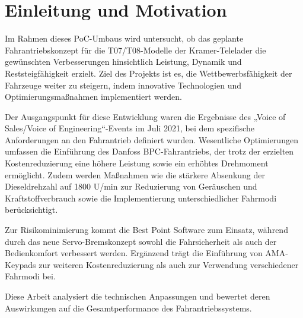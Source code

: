 \documentclass[a4paper, 12pt]{article} %
\begin{document}
\section{Einleitung und Motivation}
\begin{spacing}{1.5}  %
\fontsize{14pt}{14pt}\selectfont  %
Im Rahmen dieses \acf{PoC}-Umbaus wird untersucht, ob das 
geplante Fahrantriebskonzept für die T07/T08-Modelle der Kramer-Telelader 
die gewünschten Verbesserungen hinsichtlich Leistung, Dynamik und 
Reststeigfähigkeit erzielt. Ziel des Projekts ist es, die Wettbewerbsfähigkeit
der Fahrzeuge weiter zu steigern, indem innovative Technologien und 
Optimierungsmaßnahmen implementiert werden.

Der Ausgangspunkt für diese Entwicklung waren die Ergebnisse des
„Voice of Sales/Voice of Engineering“-Events im Juli 2021, bei dem 
spezifische Anforderungen an den Fahrantrieb definiert wurden. 
Wesentliche Optimierungen umfassen die Einführung des Danfoss 
\acf{BPC}-Fahrantriebs, der trotz der erzielten Kostenreduzierung eine höhere 
Leistung sowie ein erhöhtes Drehmoment ermöglicht. Zudem werden Maßnahmen 
wie die stärkere Absenkung der Dieseldrehzahl auf 1800 U/min zur Reduzierung
von Geräuschen und Kraftstoffverbrauch sowie die Implementierung 
unterschiedlicher Fahrmodi berücksichtigt.

Zur Risikominimierung kommt die Best Point Software zum 
Einsatz, während durch das neue Servo-Bremskonzept sowohl die Fahrsicherheit 
als auch der Bedienkomfort verbessert werden. Ergänzend trägt die Einführung 
von AMA-Keypads zur weiteren Kostenreduzierung als auch zur Verwendung 
verschiedener Fahrmodi bei.

Diese Arbeit analysiert die technischen 
Anpassungen und bewertet deren Auswirkungen auf die 
Gesamtperformance des Fahrantriebssystems.

\end{spacing}
\end{document}
